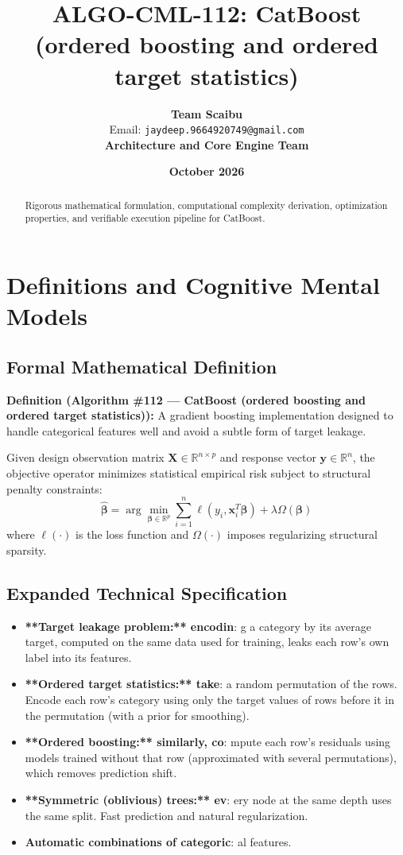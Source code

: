 \documentclass[11pt,a4paper]{article}
\title{\textbf{ALGO-CML-112: CatBoost (ordered boosting and ordered target statistics)}}
\author{\textbf{Team Scaibu} \\ \small Email: \texttt{jaydeep.9664920749@gmail.com} \\ \small \textbf{Architecture and Core Engine Team}}
\date{\textbf{October 2026}}
\theoremstyle{definition}
\begin{document}
\maketitle

\begin{abstract}
Rigorous mathematical formulation, computational complexity derivation, optimization properties, and verifiable execution pipeline for CatBoost.
\end{abstract}

\section{Definitions and Cognitive Mental Models}

\subsection{Formal Mathematical Definition}
\textbf{Definition (Algorithm \#112 --- CatBoost (ordered boosting and ordered target statistics)):}
A gradient boosting implementation designed to handle categorical features well and avoid a subtle form of target leakage.

Given design observation matrix $\mathbf{X} \in \mathbb{R}^{n \times p}$ and response vector $\mathbf{y} \in \mathbb{R}^n$, the objective operator minimizes statistical empirical risk subject to structural penalty constraints:
\begin{equation}
\hat{\boldsymbol{\beta}} = \arg\min_{\boldsymbol{\beta} \in \mathbb{R}^p} \sum_{i=1}^n \ell(y_i, \mathbf{x}_i^T \boldsymbol{\beta}) + \lambda \Omega(\boldsymbol{\beta})
\end{equation}
where $\ell(\cdot)$ is the loss function and $\Omega(\cdot)$ imposes regularizing structural sparsity.

\subsection{Expanded Technical Specification}
\begin{itemize}
\item \textbf{**Target leakage problem:** encodin}: g a category by its average target, computed on the same data used for training, leaks each row's own label into its features.
\item \textbf{**Ordered target statistics:** take}:  a random permutation of the rows. Encode each row's category using only the target values of rows before it in the permutation (with a prior for smoothing).
\item \textbf{**Ordered boosting:** similarly, co}: mpute each row's residuals using models trained without that row (approximated with several permutations), which removes prediction shift.
\item \textbf{**Symmetric (oblivious) trees:** ev}: ery node at the same depth uses the same split. Fast prediction and natural regularization.
\item \textbf{Automatic combinations of categoric}: al features.
\end{itemize}
\end{document}
